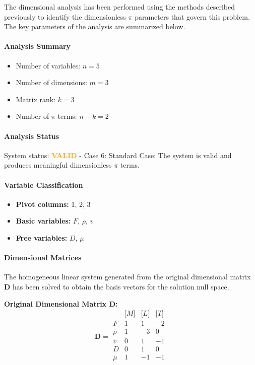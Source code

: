 The dimensional analysis has been performed using the methods described previously to identify the dimensionless $\pi$ parameters that govern this problem. The key parameters of the analysis are summarized below.

\paragraph{Analysis Summary}
\begin{itemize}
\item Number of variables: $n = 5$
\item Number of dimensions: $m = 3$
\item Matrix rank: $k = 3$
\item Number of $\pi$ terms: $n - k = 2$
\end{itemize}

\paragraph{Analysis Status}
System status: \textcolor{orange}{\textbf{VALID}} - Case 6: Standard Case: The system is valid and produces meaningful dimensionless $\pi$ terms.


\paragraph{Variable Classification}
\begin{itemize}
\item \textbf{Pivot columns:} 1, 2, 3
\item \textbf{Basic variables:} $F$, $\rho$, $v$
\item \textbf{Free variables:} $D$, $\mu$
\end{itemize}

                \paragraph{Dimensional Matrices}
                The homogeneous linear system generated from the original dimensional matrix $\mathbf{D}$ has been solved to obtain the basis vectors for the solution null space.

                \textbf{Original Dimensional Matrix $\mathbf{D}$:}
                \[\mathbf{D} = \begin{array}{r|rrr}
                & \text{[}M\text{]} & \text{[}L\text{]} & \text{[}T\text{]} \\
                \hline
                F & 1 & 1 & -2 \\
\rho & 1 & -3 & 0 \\
v & 0 & 1 & -1 \\
D & 0 & 1 & 0 \\
\mu & 1 & -1 & -1 \\

                \end{array}\]


